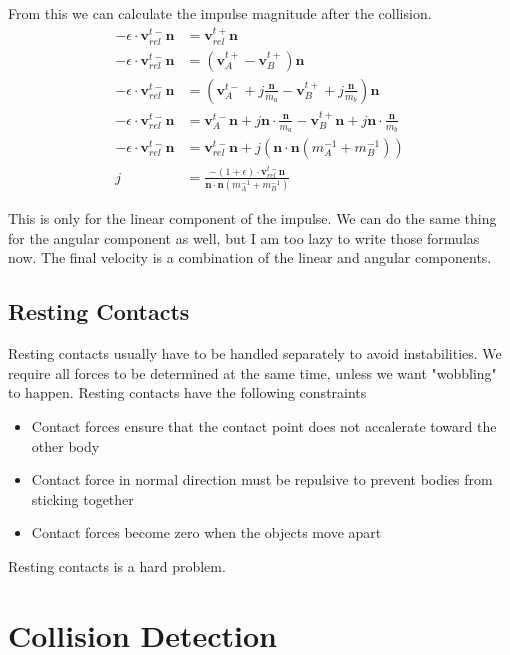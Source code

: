 \documentclass{article}
\begin{document}
From this we can calculate the impulse magnitude after the collision.
\begin{align}
    -\epsilon \cdot \bm{v}_{rel}^{t-}\bm{n} &= \bm{v}_{rel}^{t+} \bm{n}\\
    -\epsilon \cdot \bm{v}_{rel}^{t-}\bm{n} &= (\bm{v}_{A}^{t+} - \bm{v}_{B}^{t+})\bm{n}\\
    -\epsilon \cdot \bm{v}_{rel}^{t-}\bm{n} &= (\bm{v}_{A}^{t-} + j \frac{\bm{n}}{m_a} - \bm{v}_{B}^{t+} + j\frac{\bm{n}}{m_b})\bm{n}\\
    -\epsilon \cdot \bm{v}_{rel}^{t-}\bm{n} &= \bm{v}_{A}^{t-}\bm{n} + j\bm{n} \cdot \frac{\bm{n}}{m_a} - \bm{v}_{B}^{t+}\bm{n} + j\bm{n} \cdot \frac{\bm{n}}{m_b}\\
    -\epsilon \cdot \bm{v}_{rel}^{t-}\bm{n} &= \bm{v}_{rel}^{t-}\bm{n} + j(\bm{n} \cdot \bm{n}(m_A^{-1} + m_B^{-1}))\\
    j &= \frac{-(1+\epsilon) \cdot \bm{v}_{rel}^{t-} \bm{n}}{\bm{n} \cdot \bm{n} (m_A^{-1} + m_B^{-1})}
\end{align}

This is only for the linear component of the impulse.
We can do the same thing for the angular component as well, but I am too lazy to write those formulas now.
The final velocity is a combination of the linear and angular components.

\subsection{Resting Contacts}
Resting contacts usually have to be handled separately to avoid instabilities.
We require all forces to be determined at the same time, unless we want "wobbling" to happen.
Resting contacts have the following constraints
\begin{itemize}
    \item Contact forces ensure that the contact point does not accalerate toward the other body
    \item Contact force in normal direction must be repulsive to prevent bodies from sticking together
    \item Contact forces become zero when the objects move apart
\end{itemize}
Resting contacts is a hard problem.

\section{Collision Detection}
\end{document}
